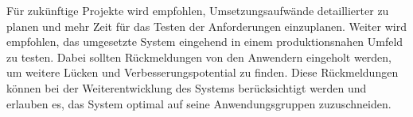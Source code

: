 Für zukünftige Projekte wird empfohlen, Umsetzungsaufwände detaillierter zu planen und mehr Zeit für das Testen der Anforderungen einzuplanen.
Weiter wird empfohlen, das umgesetzte System eingehend in einem produktionsnahen Umfeld zu testen.
Dabei sollten Rückmeldungen von den Anwendern eingeholt werden, um weitere Lücken und Verbesserungspotential zu finden.
Diese Rückmeldungen können bei der Weiterentwicklung des Systems berücksichtigt werden und erlauben es, das System optimal auf seine Anwendungsgruppen zuzuschneiden.

\clearpage
